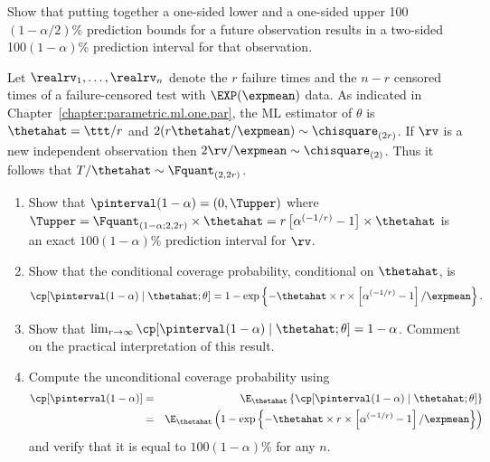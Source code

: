 \begin{exercise}
Show that putting together a one-sided lower and a one-sided upper
100$(1-\alpha/2)$\% prediction bounds for a future observation results
in a two-sided 100$(1 - \alpha)$\% prediction interval for that
observation.
\end{exercise}

\begin{exercise1}
Let $\realrv_{1}, \dots, \realrv_{n}$ denote the $r$ failure times and
the $n-r$ censored times of a failure-censored test with
$\EXP(\expmean)$ data.  As indicated in
Chapter~\ref{chapter:parametric.ml.one.par}, the ML estimator of
$\theta$ is $\thetahat=\ttt/r$ and $2(r \thetahat/ \expmean) \sim
\chisquare_{(2r)}$.  If $\rv$ is a new independent observation then
$2\rv/\expmean \sim \chisquare_{(2)}$. Thus it follows that
$T/\thetahat \sim \Fquant_{(2,2r)}$.
\begin{enumerate}
\item
Show that $\pinterval(1-\alpha)=
(0, \Tupper)$ where 
$\Tupper= \Fquant_{(1-\alpha;2,2r)} \times \thetahat =
r \left [\alpha^{(-1/r)}-1 \right ] \times \thetahat $ 
is an exact $100(1-\alpha)\%$ prediction interval for $\rv$.
\item
Show that the conditional coverage probability, conditional on
$\thetahat$, is $$\cp[\pinterval(1-\alpha) \mid \thetahat ; \theta]
=1-\exp \left \{ -\thetahat \times r \times \left [\alpha^{(-1/r)}-1
\right ]/\expmean 	\right \}.  $$
\item
Show that $\lim_{r \to \infty}\cp[\pinterval(1-\alpha) \mid \thetahat ;
\theta]= 1-\alpha$. Comment on the practical interpretation of this
result.
\item
Compute the unconditional coverage probability using
\begin{eqnarray*}
\cp[\pinterval(1-\alpha)]&=&\E_{\thetahat}\left \{
	   \cp[\pinterval(1-\alpha) \mid \thetahat ; \theta]
\right \}
\\
&=&
\E_{\thetahat}
\left (
1-\exp \left \{
-\thetahat \times r \times \left [\alpha^{(-1/r)}-1 \right ]/\expmean
	\right \}
\right )
\end{eqnarray*}
and verify that it is equal to $100(1-\alpha)\%$ for any $n$.
\end{enumerate}
\end{exercise1}
